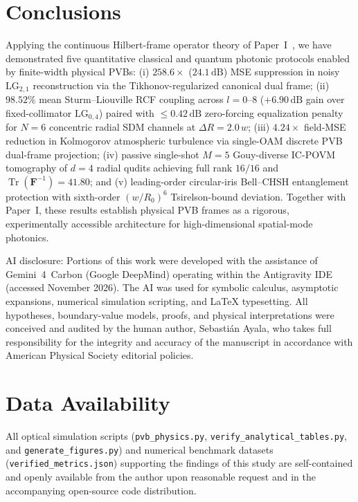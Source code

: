 \documentclass[aps,pra,reprint,nofootinbib,floatfix,longbibliography]{revtex4-2}
\begin{document}
\section{Conclusions}
\label{sec:conclusions}

Applying the continuous Hilbert-frame operator theory of Paper~I~\cite{AyalaPaperI}, we have demonstrated five quantitative classical and quantum photonic protocols enabled by finite-width physical PVBs: (i) $258.6\times$ ($24.1\,\mathrm{dB}$) MSE suppression in noisy $\mathrm{LG}_{2,1}$ reconstruction via the Tikhonov-regularized canonical dual frame; (ii) $98.52\%$ mean Sturm--Liouville RCF coupling across $l = 0\text{--}8$ ($+6.90\,\mathrm{dB}$ gain over fixed-collimator $\mathrm{LG}_{0,4}$) paired with $\le 0.42\,\mathrm{dB}$ zero-forcing equalization penalty for $N = 6$ concentric radial SDM channels at $\Delta R = 2.0\,w$; (iii) $4.24\times$ field-MSE reduction in Kolmogorov atmospheric turbulence via single-OAM discrete PVB dual-frame projection; (iv) passive single-shot $M = 5$ Gouy-diverse IC-POVM tomography of $d = 4$ radial qudits achieving full rank $16/16$ and $\operatorname{Tr}(\mathbf{F}^{-1}) = 41.80$; and (v) leading-order circular-iris Bell--CHSH entanglement protection with sixth-order $(w/R_0)^6$ Tsirelson-bound deviation. Together with Paper~I, these results establish physical PVB frames as a rigorous, experimentally accessible architecture for high-dimensional spatial-mode photonics.

\begin{acknowledgments}
AI disclosure: Portions of this work were developed with the assistance of Gemini~4~Carbon (Google DeepMind) operating within the Antigravity IDE (accessed November 2026). The AI was used for symbolic calculus, asymptotic expansions, numerical simulation scripting, and \LaTeX{} typesetting. All hypotheses, boundary-value models, proofs, and physical interpretations were conceived and audited by the human author, Sebasti\'an Ayala, who takes full responsibility for the integrity and accuracy of the manuscript in accordance with American Physical Society editorial policies.
\end{acknowledgments}

\section*{Data Availability}
All optical simulation scripts (\texttt{pvb\_\allowbreak physics.py}, \texttt{verify\_\allowbreak analytical\_\allowbreak tables.py}, and \texttt{generate\_\allowbreak figures.py}) and numerical benchmark datasets (\texttt{verified\_\allowbreak metrics.json}) supporting the findings of this study are self-contained and openly available from the author upon reasonable request and in the accompanying open-source code distribution.
\end{document}
